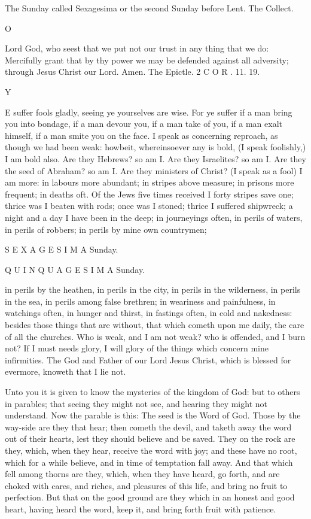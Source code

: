 The Sunday called Sexagesima or the second Sunday before Lent. The Collect.

O

Lord God, who seest that we put not our trust in any thing that we do: Mercifully grant that by thy power we may be defended against all adversity; through Jesus Christ our Lord. Amen. The Epictle. 2 C O R . 11. 19.

Y

E suffer fools gladly, seeing ye yourselves are wise. For ye suffer if a man bring you into bondage, if a man devour you, if a man take of you, if a man exalt himself, if a man smite you on the face. I speak as concerning reproach, as though we had been weak: howbeit, whereinsoever any is bold, (I speak foolishly,) I am bold also. Are they Hebrews? so am I. Are they Israelites? so am I. Are they the seed of Abraham? so am I. Are they ministers of Christ? (I speak as a fool) I am more: in labours more abundant; in stripes above measure; in prisons more frequent; in deaths oft. Of the Jews five times received I forty stripes save one; thrice was I beaten with rods; once was I stoned; thrice I suffered shipwreck; a night and a day I have been in the deep; in journeyings often, in perils of waters, in perils of robbers; in perils by mine own countrymen;

S E X A G E S I M A Sunday.

Q U I N Q U A G E S I M A Sunday.

in perils by the heathen, in perils in the city, in perils in the wilderness, in perils in the sea, in perils among false brethren; in weariness and painfulness, in watchings often, in hunger and thirst, in fastings often, in cold and nakedness: besides those things that are without, that which cometh upon me daily, the care of all the churches. Who is weak, and I am not weak? who is offended, and I burn not? If I must needs glory, I will glory of the things which concern mine infirmities. The God and Father of our Lord Jesus Christ, which is blessed for evermore, knoweth that I lie not.

Unto you it is given to know the mysteries of the kingdom of God: but to others in parables; that seeing they might not see, and hearing they might not understand. Now the parable is this: The seed is the Word of God. Those by the way-side are they that hear; then cometh the devil, and taketh away the word out of their hearts, lest they should believe and be saved. They on the rock are they, which, when they hear, receive the word with joy; and these have no root, which for a while believe, and in time of temptation fall away. And that which fell among thorns are they, which, when they have heard, go forth, and are choked with cares, and riches, and pleasures of this life, and bring no fruit to perfection. But that on the good ground are they which in an honest and good heart, having heard the word, keep it, and bring forth fruit with patience.

